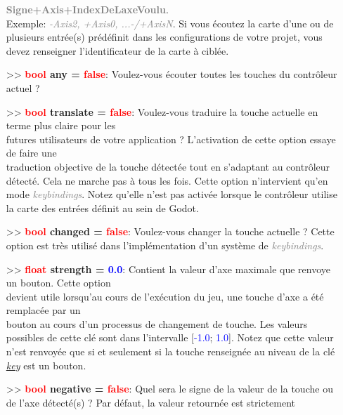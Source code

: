 \documentclass[a4paper, 11pt]{article}
\begin{document}
\begin{itemize}
		\textcolor{gray}{\textbf{Signe+Axis+IndexDeLaxeVoulu}}. \\Exemple: \textcolor{gray}{\textit{-Axis2, 
		+Axis0, ...-/+AxisN}}. \newpage Si vous écoutez la carte d'une ou de plusieurs entrée(s) prédéfinit 
		dans les configurations de votre projet, vous devez renseigner l'identificateur de la carte à 
		ciblée.\\
		\item[>> \textbf{\textcolor{red}{bool} any = \textcolor{red}{false}}:] Voulez-vous écouter toutes
		les touches du contrôleur actuel ?\\
		\item[>> \textbf{\textcolor{red}{bool} translate = \textcolor{red}{false}}:] Voulez-vous traduire 
		la touche actuelle en terme plus claire pour les \\futures utilisateurs de votre application ?
		L'activation de cette option essaye de faire une \\traduction objective de la touche détectée tout 
		en s'adaptant au contrôleur détecté. Cela ne marche pas à tous les fois. Cette option n'intervient 
		qu'en mode \textcolor{gray}{\textit{keybindings}}. Notez qu'elle n'est pas activée lorsque le 
		contrôleur utilise la carte des entrées définit au sein de Godot.\\
		\item[>> \textbf{\textcolor{red}{bool} changed = \textcolor{red}{false}}:] Voulez-vous changer la 
		touche actuelle ? Cette option est très utilisé dans l'implémentation d'un système de 
		\textcolor{gray}{\textit{keybindings}}.\\
		\item[>> \textbf{\textcolor{red}{float} strength = \textcolor{blue}{0.0}}:] Contient la valeur d'axe
		maximale que renvoye un bouton. Cette option \\devient utile lorsqu'au cours de l'exécution du jeu,
		une touche d'axe a été remplacée par un \\bouton au cours d'un processus de changement de touche. 
		Les valeurs possibles de cette clé sont dans l'intervalle [\textcolor{blue}{-1.0}; \textcolor{blue}
		{1.0}]. Notez que cette valeur n'est renvoyée que si et seulement si la touche renseignée au niveau 
		de la clé \textit{\hyperlink{key}{key}} est un bouton.\\
		\item[>> \textbf{\textcolor{red}{bool} negative = \textcolor{red}{false}}:] Quel sera le signe de la 
		valeur de la touche ou de l'axe détecté(s) ? Par défaut, la valeur retournée est strictement 

\end{itemize}
\end{document}
